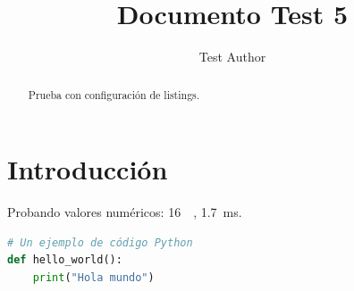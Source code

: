 \documentclass[conference,a4paper]{IEEEtran}
\begin{document}
\title{Documento Test 5}
\author{Test Author}
\maketitle

\begin{abstract}
Prueba con configuración de listings.
\end{abstract}

\section{Introducción}
Probando valores numéricos: \SI{16}{\giga\byte}, \SI{1.7}{\milli\second}.

\begin{lstlisting}[language=Python]
# Un ejemplo de código Python
def hello_world():
    print("Hola mundo")
\end{lstlisting}
\end{document}
